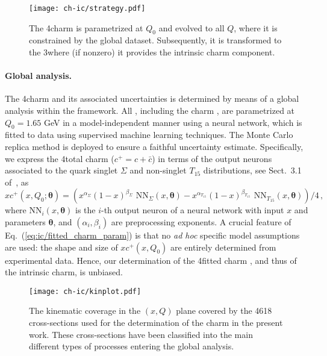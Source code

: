 \begin{figure}[h]
\begin{center}
  \texttt{[image: ch-ic/strategy.pdf]}
 \end{center}
\vspace{-0.2cm}
\caption{The 4\fns charm \pdf is parametrized  at $Q_0$
  and evolved to all  $Q$, where it is  constrained by the 
  global dataset. 
 Subsequently, it is transformed to the 3\fns where (if nonzero) it
 provides the intrinsic charm component.
  \label{fig:ic/strategy}
}
\end{figure}

\paragraph{Global \qcd analysis.}
%
The 4\fns charm \pdf and its associated
uncertainties is determined by means of a global \qcd analysis
within the  framework.
%
All \pdfs, including the charm \pdf, are  parametrized at $Q_0=1.65$ GeV in 
a model-independent manner using a neural network, which is fitted to data using 
supervised machine learning techniques.
The Monte Carlo replica method
is deployed to ensure a faithful uncertainty estimate.
%
Specifically, we express the 4\fns total charm \pdf ($c^+=c+\bar{c}$)  in terms of the output neurons associated to the quark singlet $\Sigma$ and non-singlet $T_{15}$
distributions, see Sect.~3.1 of~\cite{Ball:2021leu}, as
\begin{equation}
\label{eq:ic/fitted_charm_param}
xc^+(x,Q_0;{\boldsymbol \theta}) =
\left( x^{\alpha_{\Sigma}}(1-x)^{\beta_{\Sigma}} \textrm{ NN}_{\Sigma}(x,{\boldsymbol \theta})-
x^{\alpha_{T_{15}}}(1-x)^{\beta_{T_{15}}} \textrm{ NN}_{T_{15}}(x,{\boldsymbol \theta})
\right)/4 \, ,
\end{equation}
where $\textrm{NN}_{i}(x,{\boldsymbol \theta})$ is the $i$-th output neuron of
a neural network with input $x$ and  parameters ${\boldsymbol \theta}$, and 
$\left(\alpha_i,\beta_i\right)$ are preprocessing exponents.
%
A crucial feature of Eq.~(\ref{eq:ic/fitted_charm_param}) is that no \textit{
ad hoc} specific model assumptions are used: the shape and size of
$xc^+(x,Q_0)$ are entirely determined from experimental data.
%
Hence, our determination of the 4\fns fitted charm \pdf, and thus of the intrinsic charm, is unbiased.
%

\begin{figure}[t]
\begin{center}
  \texttt{[image: ch-ic/kinplot.pdf]}
 \end{center}
\vspace{-0.8cm}
\caption{The kinematic coverage in the $(x,Q)$ plane
  covered by the 4618 cross-sections used for the
  determination of the charm \pdf in the present work.
  These cross-sections have been classified into the main different
  types of processes entering the global analysis.
  \label{fig:ic/kinplot}
}
\end{figure}

